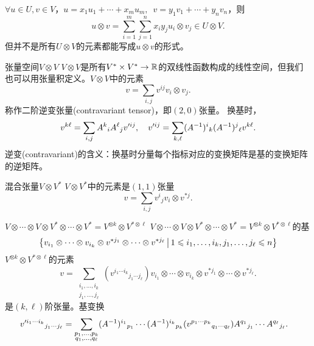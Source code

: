 \begin{example}{}{}
	$\forall u\in U,v\in V$，$u=x_1u_1+\cdots+x_mu_m,\enspace v=y_1v_1+\cdots+y_nv_n$，则 
	\[
		u\otimes v=\sum_{i=1}^m\sum_{j=1}^nx_iy_ju_i\otimes v_j\in U\otimes V.
	\]
	但并不是所有$U\otimes V$的元素都能写成$u\otimes v$的形式。
\end{example}
\begin{example}{张量空间$V\otimes V$}{}
	$V\otimes V$是所有$V^\ast\times V^\ast\to\mathbb R$的双线性函数构成的线性空间，但我们也可以用张量积定义。$V\otimes V$中的元素
	\[
		v=\sum_{i,j}v^{ij}v_i\otimes v_j.
	\]
	称作二阶逆变张量(contravariant tensor)，即$(2,0)$张量。
	\tcblower
	换基时，
	\[
		v^{k\ell}=\sum_{i,j}A^k{}_iA^\ell{}_jv'^{ij},\quad v'^{ij}=\sum_{k,\ell}(A^{-1})^i{}_k(A^{-1})^j{}_\ell v^{k\ell}.
	\]
	逆变(contravariant)的含义：换基时分量每个指标对应的变换矩阵是基的变换矩阵的逆矩阵。
\end{example}
\begin{example}{混合张量$V\otimes V^\ast$}{}
	$V\otimes V^\ast$中的元素是$(1,1)$张量
	\[
		v=\sum_{i,j}v^i{}_jv_i\otimes v^{\ast j}.
	\]
\end{example}
\begin{example}{$V\otimes\cdots\otimes V\otimes V^\ast\otimes\cdots\otimes V^\ast=V^{\otimes k}\otimes V^{\ast\otimes\ell}$}{}
	$V\otimes\cdots\otimes V\otimes V^\ast\otimes\cdots\otimes V^\ast=V^{\otimes k}\otimes V^{\ast\otimes\ell}$的基 
	\[
		\left\{v_{i_1}\otimes\cdots\otimes v_{i_k}\otimes v^{\ast j_1}\otimes\cdots\otimes v^{\ast j_\ell}\,\middle\vert\,1\leqslant i_1,\ldots,i_k,j_1,\ldots,j_\ell\leqslant n\right\}
	\]
	$V^{\otimes k}\otimes V^{\ast\otimes\ell}$的元素 
	\[
		v=\sum_{\substack{i_1,\ldots,i_k\\j_1,\ldots,j_\ell}}(v^{i_1\cdots i_k}{}_{j_1\cdots j_\ell})v_{i_1}\otimes\cdots\otimes v_{i_k}\otimes v^{\ast j_1}\otimes\cdots\otimes v^{\ast j_\ell}.
	\]
	是$(k,\ell)$阶张量。基变换
	\begin{align*}
		&v'^{i_1\cdots i_k}{}_{j_1\cdots j_\ell}=\sum_{\substack{p_1,\ldots,p_k\\q_1,\ldots,q_\ell}}(A^{-1})^{i_1}{}_{p_1}\cdots(A^{-1})^{i_k}{}_{p_k}(v^{p_1\cdots p_k}{}_{q_1\cdots q_\ell})A^{q_1}{}_{j_1}\cdots A^{q_\ell}{}_{j_\ell}.
	\end{align*}
\end{example}